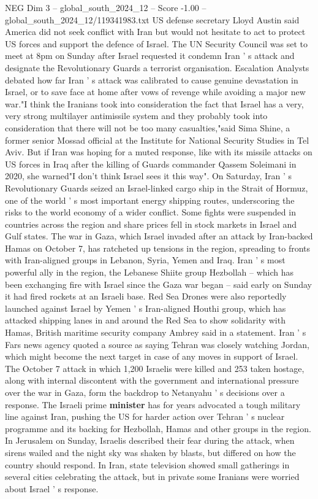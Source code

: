 \begin{textsample}{NEG Dim 3 – global\_south\_2024\_12 – Score -1.00 – global\_south\_2024\_12/119341983.txt}
US defense secretary Lloyd Austin said America did not seek conflict with Iran but would not hesitate to act to protect US forces and support the defence of Israel.
The UN Security Council was set to meet at 8pm on Sunday after Israel requested it condemn Iran ' s attack and designate the Revolutionary Guards a terrorist organisation.
Escalation Analysts debated how far Iran ' s attack was calibrated to cause genuine devastation in Israel, or to save face at home after vows of revenge while avoiding a major new war."I think the Iranians took into consideration the fact that Israel has a very, very strong multilayer antimissile system and they probably took into consideration that there will not be too many casualties,"said Sima Shine, a former senior Mossad official at the Institute for National Security Studies in Tel Aviv.
But if Iran was hoping for a muted response, like with its missile attacks on US forces in Iraq after the killing of Guards commander Qassem Soleimani in 2020, she warned"I don't think Israel sees it this way".
On Saturday, Iran ' s Revolutionary Guards seized an Israel-linked cargo ship in the Strait of Hormuz, one of the world ' s most important energy shipping routes, underscoring the risks to the world economy of a wider conflict.
Some fights were suspended in countries across the region and share prices fell in stock markets in Israel and Gulf states.
The war in Gaza, which Israel invaded after an attack by Iran-backed Hamas on October 7, has ratcheted up tensions in the region, spreading to fronts with Iran-aligned groups in Lebanon, Syria, Yemen and Iraq.
Iran ' s most powerful ally in the region, the Lebanese Shiite group Hezbollah -- which has been exchanging fire with Israel since the Gaza war began -- said early on Sunday it had fired rockets at an Israeli base.
Red Sea Drones were also reportedly launched against Israel by Yemen ' s Iran-aligned Houthi group, which has attacked shipping lanes in and around the Red Sea to show solidarity with Hamas, British maritime security company Ambrey said in a statement.
Iran ' s Fars news agency quoted a source as saying Tehran was closely watching Jordan, which might become the next target in case of any moves in support of Israel.
The October 7 attack in which 1,200 Israelis were killed and 253 taken hostage, along with internal discontent with the government and international pressure over the war in Gaza, form the backdrop to Netanyahu ' s decisions over a response.
The Israeli prime \textbf{minister} has for years advocated a tough military line against Iran, pushing the US for harder action over Tehran ' s nuclear programme and its backing for Hezbollah, Hamas and other groups in the region.
In Jerusalem on Sunday, Israelis described their fear during the attack, when sirens wailed and the night sky was shaken by blasts, but differed on how the country should respond.
In Iran, state television showed small gatherings in several cities celebrating the attack, but in private some Iranians were worried about Israel ' s response.

\end{textsample}
